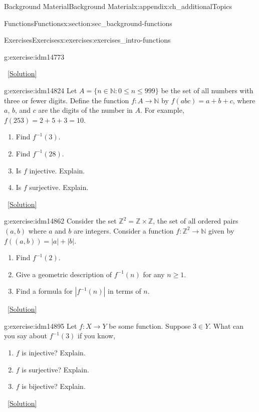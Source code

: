 \documentclass[oneside,10pt,]{book}
\numberwithin{equation}{chapter}
\def\N{\mathbb N}
\def\Z{\mathbb Z}
\def\inv{^{-1}}
\def\st{:}
\begin{document}
\begin{appendixptx}{Background Material}{}{Background Material}{}{}{x:appendix:ch_additionalTopics}
\begin{sectionptx}{Functions}{}{Functions}{}{}{x:section:sec_background-functions}
\begin{exercises-subsection}{Exercises}{}{Exercises}{}{}{x:exercises:exercises_intro-functions}
\begin{divisionexercise}{6}{}{}{g:exercise:idm14773}
\begin{enumerate}[label=(\alph*)]
\end{enumerate}
%
\qquad~\hfill{\tiny\hyperlink{g:solution:idm14797-main}{[Solution]}}\end{divisionexercise}%
\begin{divisionexercise}{7}{}{}{g:exercise:idm14824}%
Let \(A = \{n \in \N \st 0 \le n \le 999\}\) be the set of all numbers with three or fewer digits. Define the function \(f:A \to \N\) by \(f(abc) = a+b+c\), where \(a\), \(b\), and \(c\) are the digits of the number in \(A\). For example, \(f(253) = 2 + 5 + 3 =  10\).%
\begin{enumerate}[label=(\alph*)]
\item{}Find \(f\inv(3)\).%
\item{}Find \(f\inv(28)\).%
\item{}Is \(f\) injective. Explain.%
\item{}Is \(f\) surjective. Explain.%
\end{enumerate}
%
\qquad~\hfill{\tiny\hyperlink{g:solution:idm14848-main}{[Solution]}}\end{divisionexercise}%
\begin{divisionexercise}{8}{}{}{g:exercise:idm14862}%
Consider the set \(\Z^2 = \Z \times \Z\), the set of all ordered pairs \((a,b)\) where \(a\) and \(b\) are integers.  Consider a function \(f: \Z^2 \to \N\) given by \(f((a,b)) = |a| + |b|\).%
\begin{enumerate}[label=(\alph*)]
\item{}Find \(f\inv(2)\).%
\item{}Give a geometric description of \(f\inv(n)\) for any \(n \ge 1\).%
\item{}Find a formula for \(|f\inv(n)|\) in terms of \(n\).%
\end{enumerate}
%
\qquad~\hfill{\tiny\hyperlink{g:solution:idm14883-main}{[Solution]}}\end{divisionexercise}%
\begin{divisionexercise}{9}{}{}{g:exercise:idm14895}%
Let \(f:X \to Y\) be some function. Suppose \(3 \in Y\). What can you say about \(f\inv(3)\) if you know,%
\begin{enumerate}[label=(\alph*)]
\item{}\(f\) is injective? Explain.%
\item{}\(f\) is surjective? Explain.%
\item{}\(f\) is bijective? Explain.%
\end{enumerate}
%
\qquad~\hfill{\tiny\hyperlink{g:solution:idm14911-main}{[Solution]}}\end{divisionexercise}%

\end{exercises-subsection}
\end{sectionptx}
\end{appendixptx}
\end{document}

